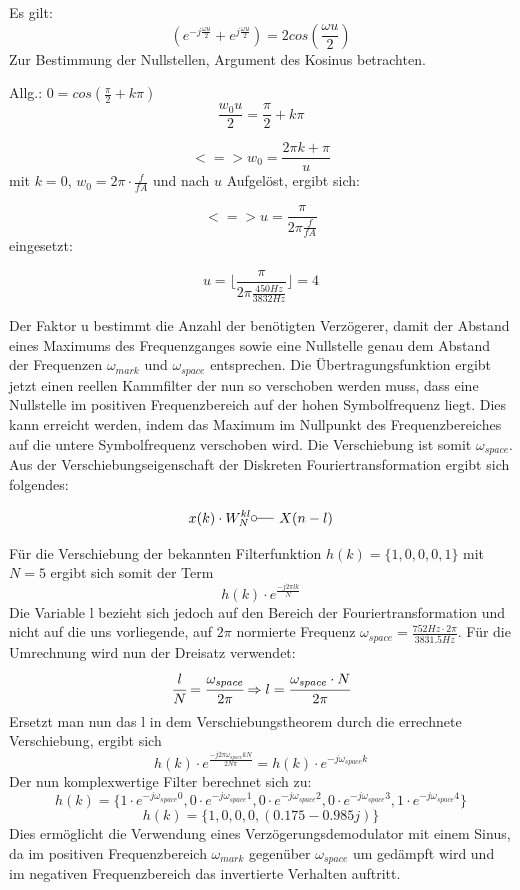 \documentclass{article}
\begin{document}
Es gilt:
$$
(e^{-j \frac{\omega u}{2}} + e^{j \frac{\omega u}{2}}) = 2  cos(\frac{\omega u}{2})
$$
Zur Bestimmung der Nullstellen, Argument des Kosinus betrachten.

Allg.: $0 = cos(\frac{\pi}{2} + k\pi)$
$$
\frac{w_0 u}{2} = \frac{\pi}{2} + k\pi
$$

$$
<=> w_0 = \frac{2\pi k + \pi}{u}
$$
mit $k = 0$, $w_0 = 2\pi \cdot \frac{f}{fA}$ und nach $u$ Aufgelöst, ergibt sich:

$$
<=> u = \frac{\pi}{2\pi \frac{f}{fA}}
$$
eingesetzt:

$$
u = \lfloor \frac{\pi}{2\pi \frac{450Hz}{3832Hz}}\rfloor = 4
$$

Der Faktor u bestimmt die Anzahl der benötigten Verzögerer, damit der Abstand eines Maximums des Frequenzganges sowie eine Nullstelle genau dem Abstand der Frequenzen $\omega_{mark}$ und $\omega_{space}$ entsprechen. Die Übertragungsfunktion ergibt jetzt einen reellen Kammfilter der nun so verschoben werden muss, dass eine Nullstelle im positiven Frequenzbereich auf der hohen Symbolfrequenz liegt. Dies kann erreicht werden, indem das Maximum im Nullpunkt des Frequenzbereiches auf die untere Symbolfrequenz verschoben wird. Die Verschiebung ist somit $\omega_{space}$.
Aus der Verschiebungseigenschaft der Diskreten Fouriertransformation ergibt sich folgendes:
 
$$
x(k) \cdot W^{kl}_N \fourier X(n-l)
$$

Für die Verschiebung der bekannten Filterfunktion $h(k) = \{1,0,0,0,1\}$ mit $N=5$ ergibt sich somit der Term
$$
h(k) \cdot e^{\frac{-j2\pi{lk}}{N}}
$$
Die Variable l bezieht sich jedoch auf den Bereich der Fouriertransformation und nicht auf die uns vorliegende, auf $2\pi$ normierte Frequenz $\omega_{space} = \frac{752Hz\cdot{2\pi}}{3831.5Hz}$. Für die Umrechnung wird nun der Dreisatz verwendet:
$$
\cfrac{l}{N} = \cfrac{\omega_{space}}{2\pi} \Rightarrow l=\cfrac{\omega_{space} \cdot N}{2\pi}
$$
Ersetzt man nun das l in dem Verschiebungstheorem durch die errechnete Verschiebung, ergibt sich
$$
h(k) \cdot e^{\frac{-j2\pi\omega_{space}kN}{2N\pi}} = h(k) \cdot e^{-j\omega_{space}k}
$$
Der nun komplexwertige Filter berechnet sich zu:
$$
h(k) = \{ 1 \cdot e^{-j\omega_{space}0} , 0 \cdot e^{-j\omega_{space}1} , 0 \cdot e^{-j\omega_{space}2} , 0 \cdot e^{-j\omega_{space}3} , 1 \cdot e^{-j\omega_{space}4}\}
$$
$$
h(k) = \{ 1, 0, 0, 0, (0.175 - 0.985j) \}
$$
Dies ermöglicht die Verwendung eines Verzögerungsdemodulator mit einem Sinus, da im positiven Frequenzbereich $\omega_{mark}$ gegenüber $\omega_{space}$ um gedämpft wird und im negativen Frequenzbereich das invertierte Verhalten auftritt.
\end{document}
